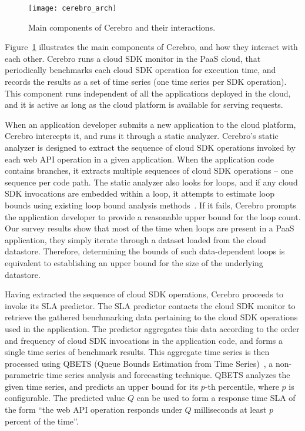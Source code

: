 \begin{figure}
\centering
\texttt{[image: cerebro\_arch]}
\caption{Main components of Cerebro and their interactions.}
\label{fig:cerebro_arch}
\vspace{-0.2in}
\end{figure}

Figure~\ref{fig:cerebro_arch} illustrates the main components of Cerebro, and how they interact with
each other. Cerebro runs a cloud SDK monitor in the PaaS cloud, that periodically benchmarks each
cloud SDK operation for execution time, and records the results as a set of time series (one time series 
per SDK operation). 
This component runs independent of all the applications deployed in the cloud, and it is active as long
as the cloud platform is available for serving requests. 

When an application developer submits a new
application to the cloud platform, Cerebro intercepts it, and runs it through a static analyzer.
Cerebro's static analyzer is designed to extract the sequence of cloud SDK operations invoked by each
web API operation in a given application. When the application code contains branches, it
extracts multiple sequences of cloud SDK operations -- one sequence per code path. The static
analyzer also looks for loops, and if any cloud SDK invocations are embedded within a loop, it attempts to
estimate loop bounds using existing loop bound analysis methods~\cite{bygde2010static}. 
If it fails, Cerebro prompts the application developer to provide a reasonable upper
bound for the loop count. Our survey results show that most of the time when loops are present in
a PaaS application, they simply iterate through a dataset loaded from the cloud datastore. 
Therefore, determining the bounds of such data-dependent loops is equivalent to establishing an 
upper bound for the size of the underlying datastore.

Having extracted the sequence of cloud SDK operations, Cerebro proceeds to invoke its SLA predictor.
The SLA predictor contacts the cloud SDK monitor to retrieve the gathered benchmarking data
pertaining to the cloud SDK operations used in the application. The predictor aggregates
this data according to the order and frequency of cloud SDK invocations in the application code, and forms a single
time series of benchmark results. This aggregate time series is then processed using QBETS (Queue
Bounds Estimation from Time Series)~\cite{Nurmi:2007:QQB:1791551.1791556}, a 
non-parametric time series analysis and forecasting technique. QBETS analyzes the given time 
series, and predicts an upper bound for its $p$-th percentile, where $p$ is configurable. The predicted
value $Q$ can be used to form a response time SLA of the form ``the web API operation responds 
under $Q$ milliseconds at least $p$ percent of the time''.


